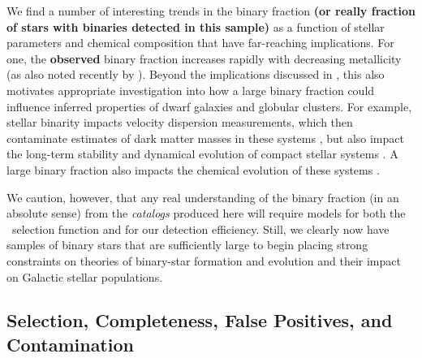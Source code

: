 \documentclass[modern]{aastex63}
\newcommand{\changes}[1]{{\bf\color{purple}#1}}
\begin{document}
We find a number of interesting trends in the binary fraction \changes{(or really fraction of stars with binaries detected in this sample)} as a function of
stellar parameters and chemical composition that have far-reaching implications.
For one, the \changes{observed} binary fraction increases rapidly with decreasing metallicity (as
also noted recently by \citealt{Moe:2019, El-Badry:2019a}).
Beyond the implications discussed in \cite{Moe:2019}, this also motivates
appropriate investigation into how a large binary fraction could influence
inferred properties of dwarf galaxies and globular clusters.
For example, stellar binarity impacts velocity dispersion measurements, which
then contaminate estimates of dark matter masses in these systems
\citep[e.g.,][]{Aaronson:1987, Kouwenhoven:2008, Martinez:2011, Spencer:2017,
Spencer:2018, Minor:2019}, but also impact the long-term stability and dynamical
evolution of compact stellar systems \citep[e.g.,][]{Hut:1992, Sigurdsson:1993}.
A large binary fraction also impacts the chemical evolution of these systems
\citep[e.g.,][]{Eldridge:2008, Eldridge:2009}.



We caution, however, that any real understanding of the binary fraction (in an
absolute sense) from the \emph{catalogs} produced here will require models for
both the \apogee\ selection function and for our detection efficiency.
Still, we clearly now have samples of binary stars that are sufficiently large
to begin placing strong constraints on theories of binary-star formation and
evolution and their impact on Galactic stellar populations.


\subsection{Selection, Completeness, False Positives, and Contamination}
\label{sec:completeness}
\end{document}
